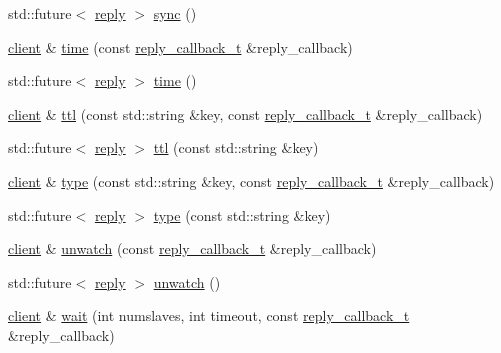 \begin{DoxyCompactItemize}
\item 
std\+::future$<$ \hyperlink{classcpp__redis_1_1reply}{reply} $>$ \hyperlink{classcpp__redis_1_1client_a09c4ffbad45c8ee8a171333ed81c8d43}{sync} ()
\item 
\hyperlink{classcpp__redis_1_1client}{client} \& \hyperlink{classcpp__redis_1_1client_aa98df57ae17365aaf0405b60f4711e92}{time} (const \hyperlink{classcpp__redis_1_1client_a061a1140d36d2eaeda82b09a0bb3f9f2}{reply\+\_\+callback\+\_\+t} \&reply\+\_\+callback)
\item 
std\+::future$<$ \hyperlink{classcpp__redis_1_1reply}{reply} $>$ \hyperlink{classcpp__redis_1_1client_a7d0d5e0a02e97ad6d8733430489df321}{time} ()
\item 
\hyperlink{classcpp__redis_1_1client}{client} \& \hyperlink{classcpp__redis_1_1client_a667bb7a6ead9c8cdaba534033a467367}{ttl} (const std\+::string \&key, const \hyperlink{classcpp__redis_1_1client_a061a1140d36d2eaeda82b09a0bb3f9f2}{reply\+\_\+callback\+\_\+t} \&reply\+\_\+callback)
\item 
std\+::future$<$ \hyperlink{classcpp__redis_1_1reply}{reply} $>$ \hyperlink{classcpp__redis_1_1client_afc4697ccb77bb16ff13c425b93ef7c1d}{ttl} (const std\+::string \&key)
\item 
\hyperlink{classcpp__redis_1_1client}{client} \& \hyperlink{classcpp__redis_1_1client_ac284ea9a5c0e95d49a675403aaf4847c}{type} (const std\+::string \&key, const \hyperlink{classcpp__redis_1_1client_a061a1140d36d2eaeda82b09a0bb3f9f2}{reply\+\_\+callback\+\_\+t} \&reply\+\_\+callback)
\item 
std\+::future$<$ \hyperlink{classcpp__redis_1_1reply}{reply} $>$ \hyperlink{classcpp__redis_1_1client_a143f362032218fef03b3408a761b8851}{type} (const std\+::string \&key)
\item 
\hyperlink{classcpp__redis_1_1client}{client} \& \hyperlink{classcpp__redis_1_1client_aaf19c28495b74c8c22a8d86e80a1557e}{unwatch} (const \hyperlink{classcpp__redis_1_1client_a061a1140d36d2eaeda82b09a0bb3f9f2}{reply\+\_\+callback\+\_\+t} \&reply\+\_\+callback)
\item 
std\+::future$<$ \hyperlink{classcpp__redis_1_1reply}{reply} $>$ \hyperlink{classcpp__redis_1_1client_a006e1258d7857f2d83bd9be48945f79a}{unwatch} ()
\item 
\hyperlink{classcpp__redis_1_1client}{client} \& \hyperlink{classcpp__redis_1_1client_ab7e11ccc1fb07ae3dce860042b96f4d9}{wait} (int numslaves, int timeout, const \hyperlink{classcpp__redis_1_1client_a061a1140d36d2eaeda82b09a0bb3f9f2}{reply\+\_\+callback\+\_\+t} \&reply\+\_\+callback)

\end{DoxyCompactItemize}
